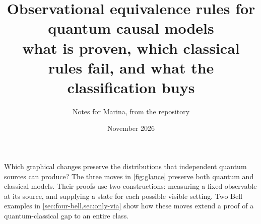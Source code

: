 \documentclass[11pt]{article}
\title{\textbf{Observational equivalence rules for quantum causal models}\\[4pt]
\large what is proven, which classical rules fail, and what the classification buys}
\author{Notes for Marina, from the \code{mDAG-analysis} repository}
\date{November 2026}
\begin{document}
\maketitle

Which graphical changes preserve the distributions that independent quantum sources can produce?
The three moves in \cref{fig:glance} preserve both quantum and classical models. Their proofs use two
constructions: measuring a fixed observable at its source, and supplying a state for each possible visible
setting. Two Bell examples in \cref{sec:four-bell,sec:only-via} show how these moves extend a proof of a
quantum-classical gap to an entire class.






\clearpage


\clearpage


\appendix




\end{document}
